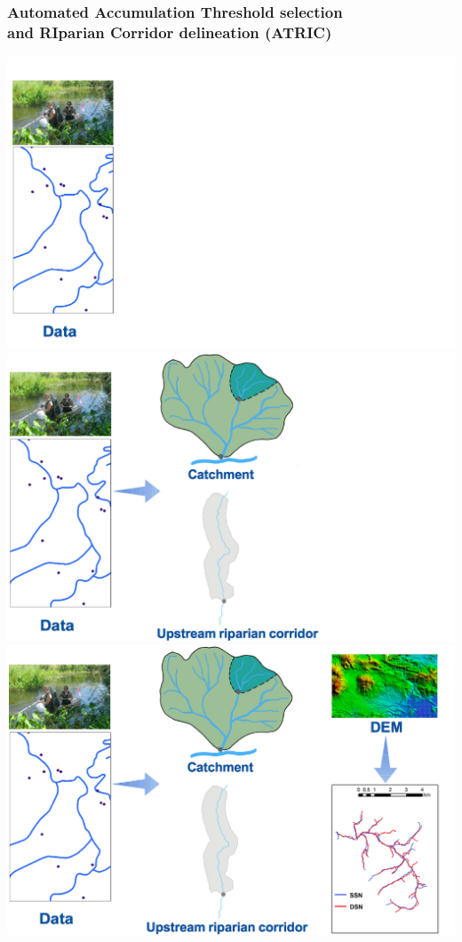 \documentclass[10pt, compress]{beamer}
\begin{document}
\begin{frame}
  \frametitle{Automated Accumulation Threshold selection \protect\\ and RIparian Corridor delineation (ATRIC)}
  \centering \vspace{4pt}
     {\includegraphics[width=1.05\textwidth]{images/ATRIC1.png}}\\
     {\includegraphics[width=1.05\textwidth]{images/ATRIC2.png}}\\
     {\includegraphics[width=1.05\textwidth]{images/ATRIC3.png}}\\
\end{frame}
\end{document}
